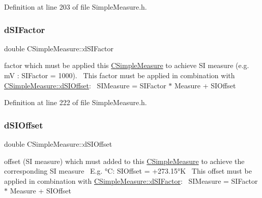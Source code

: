 Definition at line 203 of file Simple\+Measure.\+h.

\mbox{\label{classCSimpleMeasure_a08be520f9d3a0e50cc63693f2fc607f2}} 
\subsubsection{\texorpdfstring{d\+S\+I\+Factor}{dSIFactor}}
{\footnotesize\ttfamily double C\+Simple\+Measure\+::d\+S\+I\+Factor\hspace{0.3cm}{\ttfamily [protected]}}



factor which must be applied this \hyperlink{classCSimpleMeasure}{C\+Simple\+Measure} to achieve SI measure (e.\+g. mV \+: S\+I\+Factor = 1000).~\newline
 This factor must be applied in combination with \hyperlink{classCSimpleMeasure_a27c1637c744a79856ee81869e2aa8890}{C\+Simple\+Measure\+::d\+S\+I\+Offset}\+:~\newline
 S\+I\+Measure = S\+I\+Factor $\ast$ Measure + S\+I\+Offset 



Definition at line 222 of file Simple\+Measure.\+h.

\mbox{\label{classCSimpleMeasure_a27c1637c744a79856ee81869e2aa8890}} 
\subsubsection{\texorpdfstring{d\+S\+I\+Offset}{dSIOffset}}
{\footnotesize\ttfamily double C\+Simple\+Measure\+::d\+S\+I\+Offset\hspace{0.3cm}{\ttfamily [protected]}}



offset (SI measure) which must added to this \hyperlink{classCSimpleMeasure}{C\+Simple\+Measure} to achieve the corresponding SI measure~\newline
 E.\+g. °C\+: S\+I\+Offset = +273.15°K~\newline
 This offset must be applied in combination with \hyperlink{classCSimpleMeasure_a08be520f9d3a0e50cc63693f2fc607f2}{C\+Simple\+Measure\+::d\+S\+I\+Factor}\+:~\newline
 S\+I\+Measure = S\+I\+Factor $\ast$ Measure + S\+I\+Offset 



